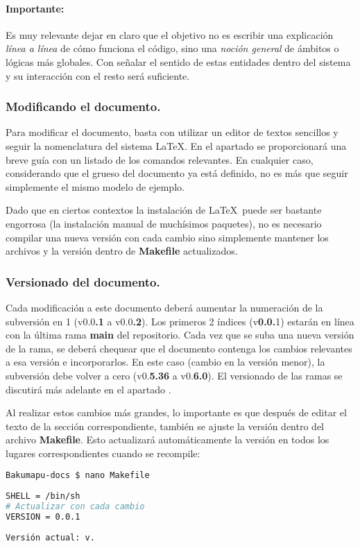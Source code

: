\paragraph*{Importante:}
Es muy relevante dejar en claro que el objetivo no es escribir una explicación \emph{línea a línea} de cómo funciona el código, sino una \emph{noción general} de ámbitos o lógicas más globales. Con señalar el sentido de estas entidades dentro del sistema y su interacción con el resto será suficiente.

\subsubsection{Modificando el documento.}\label{flujo:modificando-el-documento}
Para modificar el documento, basta con utilizar un editor de textos sencillos y seguir la nomenclatura del sistema \LaTeX. En el apartado  se proporcionará una breve guía con un listado de los comandos relevantes. En cualquier caso, considerando que el grueso del documento ya está definido, no es más que seguir simplemente el mismo modelo de ejemplo.

Dado que en ciertos contextos la instalación de \LaTeX\ puede ser bastante engorrosa (la instalación manual de muchísimos paquetes), no es necesario compilar una nueva versión con cada cambio sino simplemente mantener los archivos  y la versión dentro de \textbf{Makefile} actualizados.

\subsubsection{Versionado del documento.}\label{flujo:versionado-del-documento}
Cada modificación a este documento deberá aumentar la numeración de la subversión en 1 (v0.0\textbf{.1} a v0.0\textbf{.2}). Los primeros 2 índices (v\textbf{0.0.}1) estarán en línea con la última rama \textbf{main} del repositorio. Cada vez que se suba una nueva versión de la rama, se deberá chequear que el documento contenga los cambios relevantes a esa versión e incorporarlos. En este caso (cambio en la versión menor), la subversión debe volver a cero (v0.\textbf{5.36} a v0.\textbf{6.0}). El versionado de las ramas se discutirá más adelante en el apartado .

Al realizar estos cambios más grandes, lo importante es que después de editar el texto de la sección correspondiente, también se ajuste la versión dentro del archivo \textbf{Makefile}. Esto actualizará automáticamente la versión en todos los lugares correspondientes cuando se recompile:
\begin{lstlisting}
Bakumapu-docs $ nano Makefile
\end{lstlisting}
\begin{lstlisting}[language=bash]
SHELL = /bin/sh
# Actualizar con cada cambio
VERSION = 0.0.1
\end{lstlisting}
\begin{center}
\texttt{Versión actual: v\docversion.}
\end{center}


